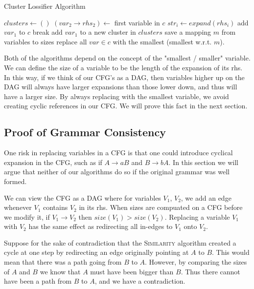 \documentclass[11pt]{article}
\newcommand{\Similarity}{\textsc{Similarity}\xspace}
\begin{document}
\begin{algorithm}[h]
\caption{Cluster Lossifier Algorithm}
\label{cluster_alg}
\begin{algorithmic}[1]
 
    \State $clusters \gets ()$
        \State $(var_2 \rightarrow rhs_2) \gets $ first variable in $c$
        \State $str_{i} \gets expand(rhs_i)$
          \State add $var_1$ to $c$
          \State break
        \EndIf
      \EndFor
        \State add $var_1$ to a new cluster in $clusters$
      \EndIf
    \EndFor
    \State save a mapping $m$ from variables to sizes
      \State replace all $var \in c$ with the smallest (smallest w.r.t. $m$).
    \EndFor
  \EndWhile
\EndProcedure
\end{algorithmic}
\end{algorithm}

Both of the algorithms depend on the concept of the "smallest / smaller"
variable. We can define the size of a variable to be the length of the
expansion of its rhs. In this way, if we think of our CFG's as a DAG, then
variables higher up on the DAG will always have larger expansions than those
lower down, and thus will have a larger size. By always replacing with the
smallest variable, we avoid creating cyclic references in our CFG.  We will
prove this fact in the next section.

\subsection{Proof of Grammar Consistency}

One risk in replacing variables in a CFG is that one could introduce cyclical
expansion in the CFG, such as if $A\rightarrow aB$ and $B\rightarrow bA$. In
this section we will argue that neither of our algorithms do so if the original
grammar was well formed.

We can view the CFG as a DAG where for variables $V_1$, $V_2$, we add an edge
whenever $V_1$ contains $V_2$ in its rhs. When sizes are compuated on a CFG
before we modify it, if $V_1 \rightarrow V_2$ then $size(V_1) > size(V_2)$.
Replacing a variable $V_1$ with $V_2$ has the same effect as redirecting all
in-edges to $V_1$ onto $V_2$.

Suppose for the sake of contradiction that the \Similarity algorithm created a
cycle at one step by redirecting an edge originally pointing at $A$ to $B$.
This would mean that there was a path going from $B$ to $A$. However, by
comparing the sizes of $A$ and $B$ we know that $A$ must have been bigger than
$B$. Thus there cannot have been a path from $B$ to $A$, and we have a
contradiction.
\end{document}
